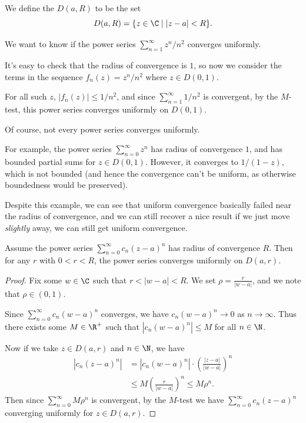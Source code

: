 \begin{definition}
    We define the  $D(a, R)$ to be the set 
    $$
    D(a, R) = \{ z \in \C \mid |z - a| < R \}.
    $$
\end{definition}

\begin{example}[Uniform Convergence of $\sum_{n = 1}^{\infty} z^n/n^2$]
    We want to know if the power series $\sum_{n = 1}^{\infty} z^n/n^2$ converges uniformly.

    It's easy to check that the radius of convergence is $1$, so now we consider the terms in the sequence $f_n(z) = z^n/n^2$ where $z \in D(0, 1)$.

    For all such $z$, $|f_n(z)| \leq 1/n^2$, and since $\sum_{n = 1}^{\infty} 1/n^2$ is convergent, by the $M$-test, this power series converges uniformly on $D(0, 1)$.
\end{example}

Of course, not every power series converges uniformly. 

For example, the power series $\sum_{n = 0}^{\infty} z^n$ has radius of convergence $1$, and has bounded partial sums for $z \in D(0, 1)$. However, it converges to $1/(1 - z)$, which is not bounded (and hence the convergence can't be uniform, as otherwise boundedness would be preserved).

Despite this example, we can see that uniform convergence basically failed near the radius of convergence, and we can still recover a nice result if we just move \emph{slightly} away, we can still get uniform convergence.

\begin{theorem}
    Assume the power series $\sum_{n = 0}^{\infty} c_n (z - a)^n$ has radius of convergence $R$. Then for any $r$ with $0 < r < R$, the power series converges uniformly on $D(a, r)$.
\end{theorem}
\begin{proof}
    Fix some $w \in \C$ such that $r < |w - a| < R$. We set $\rho = \frac{r}{|w - a|}$, and we note that $\rho \in (0, 1)$. 

    Since $\sum_{n = 0}^{\infty} c_n(w - a)^n$ converges, we have $c_n(w - a)^n \rightarrow 0$ as $n \rightarrow \infty$. Thus there exists some $M \in \R^+$ such that $|c_n(w - a)^n| \leq M$ for all $n \in \N$.

    Now if we take $z \in D(a, r)$ and $n \in \N$, we have
    \begin{align*}
        |c_n(z - a)^n| &= |c_n (w - a)^n| \cdot \left(\frac{|z - a|}{|w - a|}\right)^n \\
        &\leq M \left(\frac{r}{|w - a|}\right)^n \leq M \rho^n.
    \end{align*}
    Then since $\sum_{n = 0}^{\infty} M \rho^n$ is convergent, by the $M$-test we have $\sum_{n = 0}^{\infty} c_n(z - a)^n$ converging uniformly for $z \in D(a, r)$.
\end{proof}

